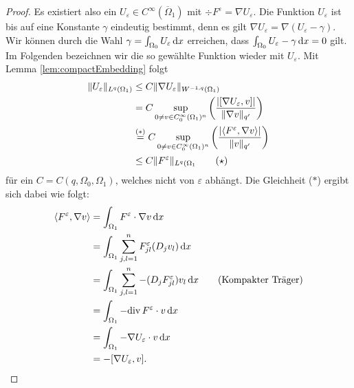 \begin{proof}
  Es existiert also ein $U_\varepsilon \in C^\infty(\overline\Omega_1)$ mit $\div F^\varepsilon = \nabla U_\varepsilon$.
  Die Funktion $U_\varepsilon$ ist bis auf eine Konstante $\gamma$ eindeutig bestimmt, denn es gilt $\nabla U_\varepsilon = \nabla( U_\varepsilon - \gamma)$.
  Wir können durch die Wahl $\gamma = \int_{\Omega_0} U_\varepsilon \, {\operatorname{d}\!{x}}$ erreichen, dass $\int_{\Omega_0} U_\varepsilon - \gamma \, {\operatorname{d}\!{x}} = 0$  gilt.
  Im Folgenden bezeichnen wir die so gewählte Funktion wieder mit $U_\varepsilon$.
  Mit Lemma \ref{lem:compactEmbedding} folgt
  \begingroup
  \addtolength{\jot}{1em}
  \begin{align*}
    \lVert U_\varepsilon \rVert_{L^q(\Omega_1)}
    &\leq C \lVert  \nabla U_\varepsilon  \rVert_{W^{-1,q}(\Omega_1)} \\
    &= C \sup_{0 \neq v \in C_0^\infty(\Omega_1)^n} \left(\frac{|[\nabla U_\varepsilon, v]|}{\lVert \nabla v \rVert_{q'}} \right) \\
    &\overset{(\ast)}{=} C \sup_{0 \neq v \in C_0^\infty(\Omega_1)^n} \left( \frac{|\langle F^\varepsilon, \nabla v \rangle|}{\lVert v \rVert_{q'}}\right) \\
    &\leq C \lVert F^\varepsilon \rVert_{L^q(\Omega_1} \tag{$\star$}
  \end{align*}
  \endgroup
  für ein $C = C(q,\Omega_0,\Omega_1)$, welches nicht von $\varepsilon$ abhängt. 
  Die Gleichheit ($\ast$) ergibt sich dabei wie folgt:
  \begin{align*}
    \langle F^\varepsilon, \nabla v \rangle
    &= \int_{\Omega_1} F^\varepsilon \cdot \nabla v \, {\operatorname{d}\!{x}} \\
    &= \int_{\Omega_1} \sum_{j,l=1}^n F_{jl}^\varepsilon (D_j v_l) \, {\operatorname{d}\!{x}} \\
    &= \int_{\Omega_1} \sum_{j,l=1}^n -(D_jF_{jl}^\varepsilon) v_l \, {\operatorname{d}\!{x}} \tag{Kompakter Träger}\\
    &= \int_{\Omega_1} -\mathrm{div\,} F^\varepsilon \cdot v \, {\operatorname{d}\!{x}} \\
    &= \int_{\Omega_1} -\nabla U_\varepsilon \cdot v \, {\operatorname{d}\!{x}} \\
    &= -[\nabla U_\varepsilon, v].
  \end{align*}


\end{proof}

